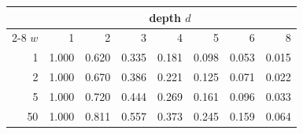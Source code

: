 \begin{tabular}{rrrrrrrr}
\toprule
& \multicolumn{7}{c}{depth $d$} \\
\cmidrule(lr){2-8}
$w$ & 1 & 2 & 3 & 4 & 5 & 6 & 8 \\
\midrule
1 & 1.000 & 0.620 & 0.335 & 0.181 & 0.098 & 0.053 & 0.015 \\
2 & 1.000 & 0.670 & 0.386 & 0.221 & 0.125 & 0.071 & 0.022 \\
5 & 1.000 & 0.720 & 0.444 & 0.269 & 0.161 & 0.096 & 0.033 \\
50 & 1.000 & 0.811 & 0.557 & 0.373 & 0.245 & 0.159 & 0.064 \\
\bottomrule
\end{tabular}